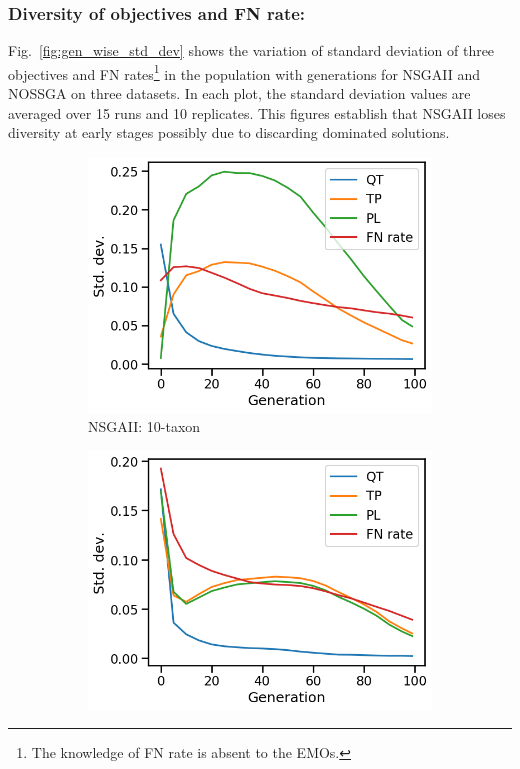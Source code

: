 \subsubsection{Diversity of objectives and FN rate:}\label{subsubsec:diversity} Fig.~\ref{fig:gen_wise_std_dev} shows the variation of standard deviation of three objectives and FN rates\footnote{The knowledge of FN rate is absent to the EMOs.} in the population with generations for NSGAII and NOSSGA on three datasets. In each plot, the standard deviation values are averaged over 15 runs and 10 replicates. This figures establish that NSGAII loses diversity at early stages possibly due to discarding dominated solutions.    
\begin{figure}[!htbp]
	\centering
	\begin{adjustwidth}{-1cm}{-1cm}
		\begin{subfigure}[b]{0.4\textwidth}
			\includegraphics[width=\textwidth]{Figure/10-taxon_NSGAII_std_dev}
			\caption{NSGAII: 10-taxon}
		\end{subfigure}%
		\begin{subfigure}[b]{0.4\textwidth}
			\includegraphics[width=\textwidth]{Figure/11-taxon_NSGAII_std_dev}

\end{subfigure}
\end{adjustwidth}
\end{figure}
